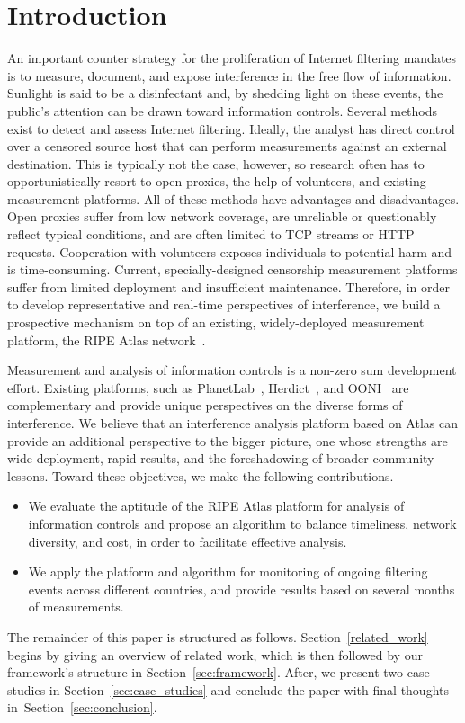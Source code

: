 \section{Introduction}

An important counter strategy for the proliferation of Internet filtering mandates is to
measure, document, and expose interference in the free flow of information.  Sunlight is said to be a
disinfectant and, by shedding light on these events, the public's attention can
be drawn toward information controls.  Several methods exist to detect and assess
Internet filtering.  Ideally, the analyst has direct control over a censored
source host that can perform measurements against an external destination.
This is typically not the case, however, so research often has to
opportunistically resort to open proxies, the help of volunteers, and existing
measurement platforms.  All of these methods have advantages and disadvantages.
Open proxies suffer from low network coverage, are unreliable or questionably
reflect typical conditions, and are often limited to TCP streams or HTTP
requests.  Cooperation with volunteers exposes individuals to potential harm
and is time-consuming. Current, specially-designed censorship measurement
platforms suffer from limited deployment and insufficient maintenance.
Therefore, in order to develop representative and real-time perspectives of
interference, we build a prospective mechanism on top of an existing,
widely-deployed measurement platform, the RIPE Atlas network~\cite{atlas}.

Measurement and analysis of information controls is a non-zero sum development effort.
Existing platforms, such as PlanetLab~\cite{planetlab}, Herdict~\cite{Herdict},
and OONI~\cite{Filasto2012} are complementary and provide unique perspectives
on the diverse forms of interference.  We believe that an interference analysis
platform based on Atlas can provide an additional perspective to the bigger
picture, one whose strengths are wide deployment, rapid results, and the
foreshadowing of broader community lessons.  Toward these objectives, we make the
following contributions.

\begin{itemize}
	\item We evaluate the aptitude of the RIPE Atlas platform for
		analysis of information controls and propose an algorithm to balance timeliness, network
		diversity, and cost, in order to facilitate effective analysis.
	\item We apply the platform and algorithm for monitoring of ongoing
		filtering events across different countries, and provide results based
		on several months of measurements.
\end{itemize}

The remainder of this paper is structured as follows.
Section~\ref{related_work} begins by giving an overview of related work, which
is then followed by our framework's structure in
Section~\ref{sec:framework}. After, we present two case studies in
Section~\ref{sec:case_studies} and conclude the paper with final thoughts
in~Section~\ref{sec:conclusion}.
